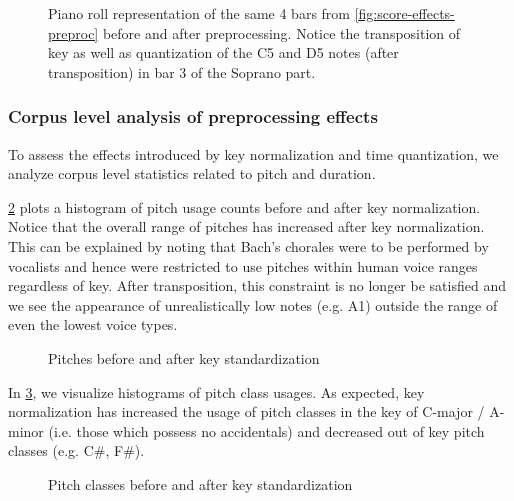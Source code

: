 \begin{figure}[tb]
    \centering
        
        
    \caption{Piano roll representation of the same 4 bars from \cref{fig:score-effects-preproc}
    before and after preprocessing. Notice the transposition of key as well as quantization
    of the C5 and D5 notes (after transposition) in bar 3 of the Soprano part.}
    \label{fig:piano-roll-effects-preproc}
\end{figure}

\subsubsection{Corpus level analysis of preprocessing effects}

To assess the effects introduced by key normalization and time quantization,
we analyze corpus level statistics related to pitch and duration.

\cref{fig:pitch-key-standardization} plots a histogram of pitch usage counts
before and after key normalization. Notice that the overall range of pitches
has increased after key normalization. This can be explained by noting that
Bach's chorales were to be performed by vocalists and hence were restricted to
use pitches within human voice ranges regardless of key. After transposition,
this constraint is no longer be satisfied and we see the appearance of
unrealistically low notes (e.g. A1) outside the range of even the lowest voice
types.

\begin{figure}[tb]
    \centering
    
    
    \caption{Pitches before and after key standardization}
    \label{fig:pitch-key-standardization}
\end{figure}

In \cref{fig:pc-key-standardization}, we visualize histograms of pitch class usages.
As expected, key normalization has increased the usage of pitch classes in the key of
C-major / A-minor (i.e. those which possess no accidentals) and decreased out of key
pitch classes (e.g. C\#, F\#).

\begin{figure}
    \centering
    \begin{subfigure}[b]{0.48\textwidth}
        \centering
        
    \end{subfigure}
    \begin{subfigure}[b]{0.48\textwidth}
        \centering
        
    \end{subfigure}
    \caption{Pitch classes before and after key standardization}
    \label{fig:pc-key-standardization}
\end{figure}

